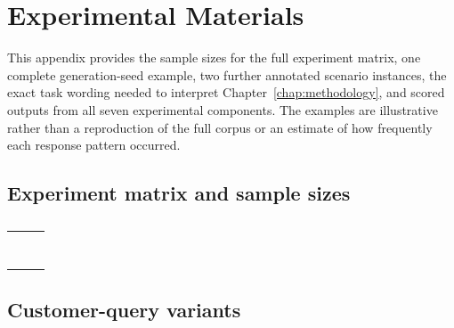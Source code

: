 \chapter{Experimental Materials}
\label{app:materials}

\begin{revisionblock}
This appendix provides the sample sizes for the full experiment matrix, one complete generation-seed example, two further annotated scenario instances, the exact task wording needed to interpret Chapter~\ref{chap:methodology}, and scored outputs from all seven experimental components. The examples are illustrative rather than a reproduction of the full corpus or an estimate of how frequently each response pattern occurred.
\end{revisionblock}

\section{Experiment matrix and sample sizes}
\begin{table}[htbp]
\centering
\caption{}
\label{app:experiment-sample-sizes}
\small
\begin{tabularx}{0.94\textwidth}{@{}Yrr@{}}
\toprule
{} &  &  \\
\midrule
{} &  &  \\
 &  &  \\
 &  &  \\
 &  &  \\
 &  &  \\
 &  &  \\
 &  &  \\
\midrule
{} & &  \\
\bottomrule
\end{tabularx}
\end{table}



\section{Customer-query variants}

